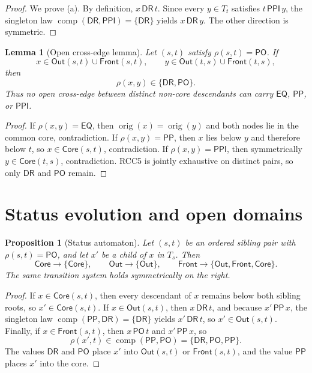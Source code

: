 \documentclass[11pt]{article}
\newtheorem{proposition}[definition]{Proposition}
\newtheorem{lemma}[definition]{Lemma}
\theoremstyle{remark}
\newcommand{\DR}{\mathsf{DR}}
\newcommand{\PO}{\mathsf{PO}}
\newcommand{\PP}{\mathsf{PP}}
\newcommand{\PPI}{\mathsf{PPI}}
\newcommand{\EQ}{\mathsf{EQ}}
\newcommand{\comp}{\operatorname{comp}}
\newcommand{\orig}{\operatorname{orig}}
\newcommand{\Core}{\mathsf{Core}}
\newcommand{\Out}{\mathsf{Out}}
\newcommand{\Front}{\mathsf{Front}}
\begin{document}
\begin{proof}
We prove (a). By definition, $x\,\DR\,t$. Since every $y\in T_t$ satisfies $t\,\PPI\,y$, the singleton law $\comp(\DR,\PPI)=\{\DR\}$ yields $x\,\DR\,y$. The other direction is symmetric.
\end{proof}

\begin{lemma}[Open cross-edge lemma]\label{lem:open-cross-completed}
Let $(s,t)$ satisfy $\rho(s,t)=\PO$. If
\[
 x\in \Out(s,t)\cup\Front(s,t),\qquad y\in \Out(t,s)\cup\Front(t,s),
\]
then
\[
\rho(x,y)\in\{\DR,\PO\}.
\]
Thus no open cross-edge between distinct non-core descendants can carry $\EQ$, $\PP$, or $\PPI$.
\end{lemma}

\begin{proof}
If $\rho(x,y)=\EQ$, then $\orig(x)=\orig(y)$ and both nodes lie in the common core, contradiction. If $\rho(x,y)=\PP$, then $x$ lies below $y$ and therefore below $t$, so $x\in\Core(s,t)$, contradiction. If $\rho(x,y)=\PPI$, then symmetrically $y\in\Core(t,s)$, contradiction. RCC5 is jointly exhaustive on distinct pairs, so only $\DR$ and $\PO$ remain.
\end{proof}

\section{Status evolution and open domains}

\begin{proposition}[Status automaton]\label{prop:status-automaton-completed}
Let $(s,t)$ be an ordered sibling pair with $\rho(s,t)=\PO$, and let $x'$ be a child of $x$ in $T_s$. Then
\[
\Core\to\{\Core\},\qquad \Out\to\{\Out\},\qquad \Front\to\{\Out,\Front,\Core\}.
\]
The same transition system holds symmetrically on the right.
\end{proposition}

\begin{proof}
If $x\in\Core(s,t)$, then every descendant of $x$ remains below both sibling roots, so $x'\in\Core(s,t)$. If $x\in\Out(s,t)$, then $x\,\DR\,t$, and because $x'\,\PP\,x$, the singleton law $\comp(\PP,\DR)=\{\DR\}$ yields $x'\,\DR\,t$, so $x'\in\Out(s,t)$. Finally, if $x\in\Front(s,t)$, then $x\,\PO\,t$ and $x'\,\PP\,x$, so
\[
\rho(x',t)\in \comp(\PP,\PO)=\{\DR,\PO,\PP\}.
\]
The values $\DR$ and $\PO$ place $x'$ into $\Out(s,t)$ or $\Front(s,t)$, and the value $\PP$ places $x'$ into the core.
\end{proof}
\end{document}
